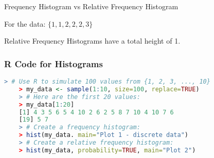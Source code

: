 \documentclass[../Notes.tex]{subfiles}
\begin{document}
    \begin{center}
        Frequency Histogram vs Relative Frequency Histogram

        For the data: $\{1, 1, 2, 2, 2, 3\}$
    
        \begin{figure*}[h]
            \centering
            \begin{minipage}[h]{.45\linewidth}
            \end{minipage}
            \begin{minipage}[h]{.45\linewidth}
            \end{minipage}
        \end{figure*}
    \end{center}

    Relative Frequency Histograms have a total height of 1.

    \pagebreak

    \subsubsection{R Code for Histograms}

\begin{lstlisting}[language=R]
    > # Use R to simulate 100 values from {1, 2, 3, ..., 10}
    > my_data <- sample(1:10, size=100, replace=TRUE)
    > # Here are the first 20 values:
    > my_data[1:20]
    [1] 4 3 5 6 5 4 10 2 6 2 5 8 7 10 4 10 7 6
    [19] 5 7
    > # Create a frequency histogram:
    > hist(my_data. main="Plot 1 - discrete data")
    > # Create a relative frequency histogram:
    > hist(my_data, probability=TRUE, main="Plot 2")
\end{lstlisting}
\end{document}
